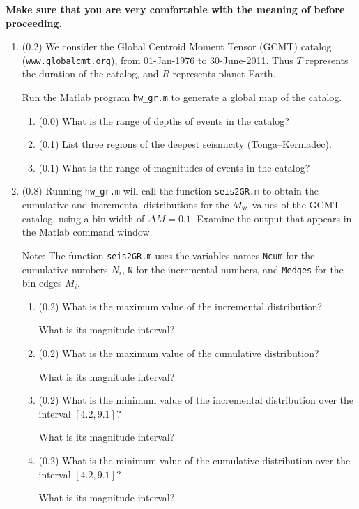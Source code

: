 \documentclass[11pt,titlepage,fleqn]{article}
\begin{document}
{\bf Make sure that you are very comfortable with the meaning of  before proceeding.}

\begin{enumerate}
\item (0.2) We consider the Global Centroid Moment Tensor (GCMT) catalog (\verb+www.globalcmt.org+), from 01-Jan-1976 to 30-June-2011. Thus $T$ represents the duration of the catalog, and $R$ represents planet Earth.

Run the Matlab program \verb+hw_gr.m+ to generate a global map of the catalog.
%
\begin{enumerate}
\item (0.0) What is the range of depths of events in the catalog?
\item (0.1) List three regions of the deepest seismicity (\eg Tonga--Kermadec).
\item (0.1) What is the range of magnitudes of events in the catalog?
\end{enumerate}

\item (0.8) Running \verb+hw_gr.m+ will call the function \verb+seis2GR.m+ to obtain the cumulative and incremental distributions for the $M_{\rm w}$ values of the GCMT catalog, using a bin width of $\Delta M = 0.1$. Examine the output that appears in the Matlab command window.

Note: The function \verb+seis2GR.m+ uses the variables names \verb+Ncum+ for the cumulative numbers $N_i$, \verb+N+ for the incremental numbers, and \verb+Medges+ for the bin edges $M_i$.

\begin{enumerate}
\item (0.2) What is the maximum value of the incremental distribution?

What is its magnitude interval?

\item (0.2) What is the maximum value of the cumulative distribution?

What is its magnitude interval?

\item (0.2) What is the minimum value of the incremental distribution over the interval $[4.2,9.1]$? 

What is its magnitude interval?

\item (0.2) What is the minimum value of the cumulative distribution over the interval $[4.2,9.1]$? 

What is its magnitude interval?


\end{enumerate}
\end{enumerate}
\end{document}
